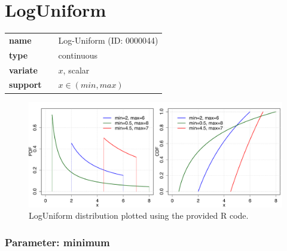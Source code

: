 %
%
\section*{LogUniform} 

  \bigskip 

\begin{tabular}{p{2cm}cl}
\textbf{name} & & Log-Uniform (ID: 0000044)\\ 
 
\textbf{type} & & continuous \\ 

\textbf{variate} & & $x$, scalar \\ 

\textbf{support} & & $x \in (min,max)$
\end{tabular}

\begin{figure}[ht!]
\centering
  \includegraphics[width=140mm]{pics/LogUniform.pdf}
 \caption{LogUniform distribution plotted using the provided R code.}
 \label{fig:LogUniform}
\end{figure}

\subsubsection*{Parameter: minimum}

